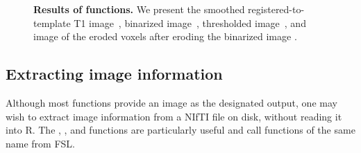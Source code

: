 \begin{figure}
   \hspace*{-0.9em}
\hfill
   \hspace*{-0.9em}
\hfill
   \hspace*{-0.9em}
\hfill
\caption[{\bf Results of  functions.}]{{\bf Results of  functions.}  We present the smoothed registered-to-template T1 image~\protect{}, binarized image~\protect{}, thresholded image~\protect{}, and image of the eroded voxels after eroding the binarized image \protect{}.  }
\label{fig:fslr_func}
\end{figure}


\subsection{Extracting image information}
Although most  functions provide an image as the designated output, one may wish to extract image information from a NIfTI file on disk, without reading it into R.  The  , , and  functions are particularly useful and call functions of the same name from FSL.

